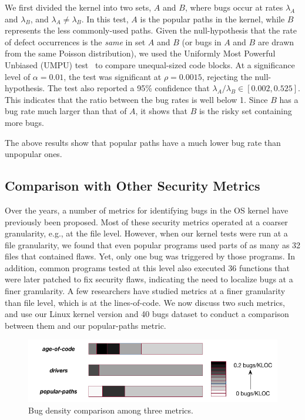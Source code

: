 We first divided the kernel into two sets,
$A$ and $B$, where bugs occur at rates $\lambda_A$ and
$\lambda_B$, and $\lambda_A \neq \lambda_B$. In this test, $A$ is the popular
paths in the kernel, while $B$
represents the less commonly-used paths. Given the null-hypothesis
that the rate of defect occurrences is the \textit{same} in set $A$ and $B$
(or bugs in $A$ and $B$ are drawn from the same Poisson distribution),
we used the Uniformly Most Powerful Unbiased (UMPU) test~\cite{shiue1982experiment}
to compare unequal-sized code blocks.
At a significance level of $\alpha=0.01$, the test was significant at
$\rho=0.0015$, rejecting the null-hypothesis.
The test also reported a 95\% confidence that $\lambda_A / \lambda_B
\in [0.002, 0.525]$. This indicates that the ratio between the bug rates is well
below 1. Since $B$ has a bug rate much larger than that of $A$, it shows 
that $B$ is the risky set containing more bugs. 

The above results show that
popular paths have a much lower bug rate than unpopular ones.

\subsection{Comparison with Other Security Metrics}

Over the years, a number of metrics for identifying bugs in the OS kernel have
previously been proposed. Most of these security metrics operated at a coarser granularity,
e.g., at the file level. However, when our kernel tests were run at a file
granularity, we found that even popular programs used parts of as many as
32 files that contained flaws. Yet, only one bug was triggered by those programs.
In addition, common programs tested at this level also executed 36 functions
that were later patched to fix security
flaws, indicating the need to localize bugs at a finer granularity.
A few researchers have studied metrics at a finer granularity than file level, which
is at the lines-of-code.
We now discuss two such metrics, and use our Linux kernel version and 40 bugs dataset
to conduct a comparison between them and our popular-paths metric.

\begin{figure}
\centering
\includegraphics[width=1.2\columnwidth]{diagram/bug_density_v2.png}
\caption{\small Bug density comparison among three metrics.}
\label{fig:bug_density}
\end{figure}

